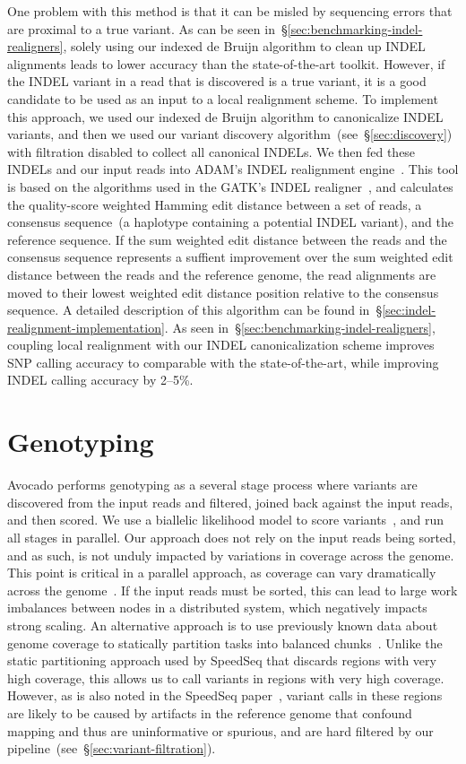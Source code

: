 \documentclass[phd]{ucbthesis}
\begin{document}
One problem with this method is that it can be misled by sequencing errors
that are proximal to a true variant. As can be seen in~\S\ref{sec:benchmarking-indel-realigners},
solely using our indexed de Bruijn algorithm to clean up INDEL alignments leads
to lower accuracy than the state-of-the-art toolkit. However, if the INDEL
variant in a read that is discovered is a true variant, it is a good candidate
to be used as an input to a local realignment scheme.  To implement this
approach, we used our indexed de Bruijn algorithm to canonicalize INDEL variants,
and then we used our variant discovery algorithm~(see~\S\ref{sec:discovery})
with filtration disabled to collect all canonical INDELs. We then fed these
INDELs and our input reads into {ADAM}'s INDEL realignment
engine~\cite{massie13, nothaft15}. This tool is based on the algorithms used in
the {GATK}'s INDEL realigner~\cite{depristo11}, and calculates the quality-score
weighted Hamming edit distance between a set of reads, a consensus sequence~(a
haplotype containing a potential INDEL variant), and the reference sequence. If
the sum weighted edit distance between the reads and the consensus sequence
represents a suffient improvement over the sum weighted edit distance between
the reads and the reference genome, the read alignments are moved to their
lowest weighted edit distance position relative to the consensus sequence.
A detailed description of this algorithm can be found in~\S\ref{sec:indel-realignment-implementation}.
As seen in~\S\ref{sec:benchmarking-indel-realigners}, coupling local realignment with our INDEL
canonicalization scheme improves SNP calling accuracy to comparable with the
state-of-the-art, while improving INDEL calling accuracy by 2--5\%.

\section{Genotyping}
\label{sec:genotyping}

{Avocado} performs genotyping as a several stage process where variants
are discovered from the input reads and filtered, joined back against the input
reads, and then scored. We use a biallelic likelihood model to score
variants~\cite{li11}, and run all stages in parallel. Our approach does not
rely on the input reads being sorted, and as such, is not unduly impacted by
variations in coverage across the genome. This point is critical in a parallel
approach, as coverage can vary dramatically across the genome~\cite{pinard06}.
If the input reads must be sorted, this can lead to large work imbalances
between nodes in a distributed system, which negatively impacts strong scaling.
An alternative approach is to use previously known data about genome coverage
to statically partition tasks into balanced chunks~\cite{chiang15}. Unlike the
static partitioning approach used by {SpeedSeq} that discards regions with
very high coverage, this allows us to call variants in regions with very high
coverage. However, as is also noted in the {SpeedSeq} paper~\cite{chiang15}, variant calls
in these regions are likely to be caused by artifacts in the reference genome that
confound mapping and thus are uninformative or spurious, and are hard filtered by
our pipeline~(see~\S\ref{sec:variant-filtration}).
\end{document}
